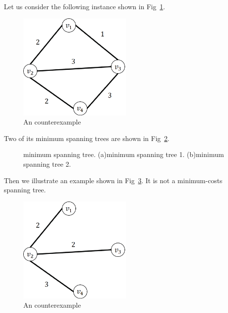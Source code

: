 Let us consider the following instance shown in Fig~\ref{fig_5_1}.
\begin{figure}[!htbp]
\centering
\includegraphics[width=0.5\textwidth]{figures/3.eps}
\caption{An counterexample}\label{fig_5_1}
\end{figure}
Two of its minimum spanning trees are shown in Fig~\ref{fig_5_2}.
\begin{figure}[!htbp]
\centering
{}
\caption{minimum spanning tree. (a)minimum spanning tree 1.
(b)minimum spanning tree 2.}\label{fig_5_2}
\end{figure}
Then we illustrate an example shown in Fig~\ref{fig_5_3}. It is not a minimum-costs spanning tree.
\begin{figure}[!htbp]
\centering
\includegraphics[width=0.5\textwidth]{figures/6.eps}
\caption{An counterexample}\label{fig_5_3}
\end{figure}


